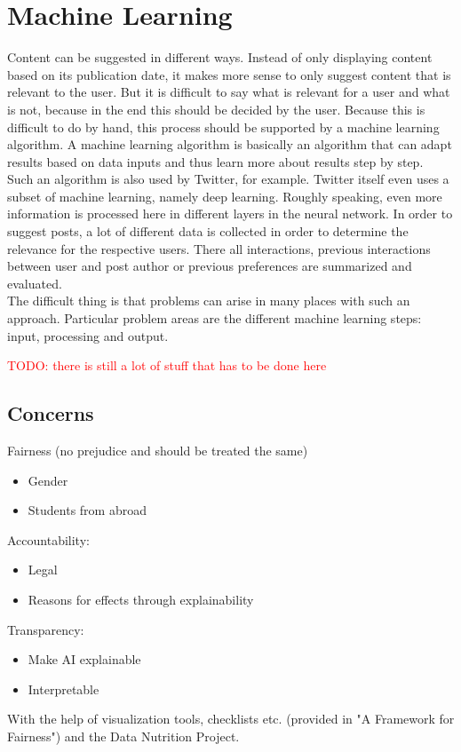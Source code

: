 \section{Machine Learning}\label{sec:ai}
Content can be suggested in different ways.
Instead of only displaying content based on its publication date, it makes more sense to only suggest content that is relevant to the user.
But it is difficult to say what is relevant for a user and what is not, because in the end this should be decided by the user.
Because this is difficult to do by hand, this process should be supported by a machine learning algorithm.
A machine learning algorithm is basically an algorithm that can adapt results based on data inputs and thus learn more about results step by step.\\

Such an algorithm is also used by Twitter, for example\cite{twitter-deep-learning}.
Twitter itself even uses a subset of machine learning, namely deep learning.
Roughly speaking, even more information is processed here in different layers in the neural network.
In order to suggest posts, a lot of different data is collected in order to determine the relevance for the respective users.
There all interactions, previous interactions between user and post author or previous preferences are summarized and evaluated.\\

The difficult thing is that problems can arise in many places with such an approach.
Particular problem areas are the different machine learning steps: input, processing and output.




\textcolor{red}{TODO: there is still a lot of stuff that has to be done here}

\subsection{Concerns}
Fairness (no prejudice and should be treated the same)
\begin{itemize}
    \item Gender
    \item Students from abroad
\end{itemize}

Accountability:
\begin{itemize}
    \item Legal
    \item Reasons for effects through explainability
\end{itemize}

Transparency:
\begin{itemize}
    \item Make AI explainable
    \item Interpretable
\end{itemize}


With the help of visualization tools, checklists etc. (provided in "A Framework for Fairness") and the Data Nutrition Project.

